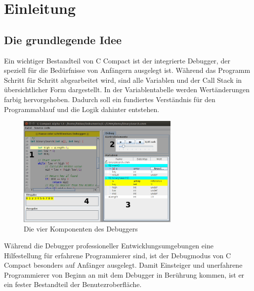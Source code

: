 

\section{Einleitung}


\subsection{Die grundlegende Idee}
Ein wichtiger Bestandteil von C Compact ist der integrierte Debugger, der speziell für die Bedürfnisse von Anfängern ausgelegt ist. Während das Programm Schritt für Schritt abgearbeitet wird, sind alle Variablen und der Call Stack in übersichtlicher Form dargestellt. In der Variablentabelle werden Wertänderungen farbig hervorgehoben. Dadurch soll ein fundiertes Verständnis für den Programmablauf und die Logik dahinter entstehen.

\begin{figure}[htp]
\centering
\includegraphics[width=0.7\textwidth]{./media/images/gui/debugger/gui-debugger-marked.png}
\caption{Die vier Komponenten des Debuggers}
\label{fig:deb-intro-m1}
\end{figure}

Während die Debugger professioneller Entwicklungsumgebungen eine Hilfestellung für erfahrene Programmierer sind, ist der Debugmodus von C Compact besonders auf Anfänger ausgelegt. Damit Einsteiger und unerfahrene Programmierer von Beginn an mit dem Debugger in Berührung kommen, ist er ein fester Bestandteil der Benutezroberfläche.

